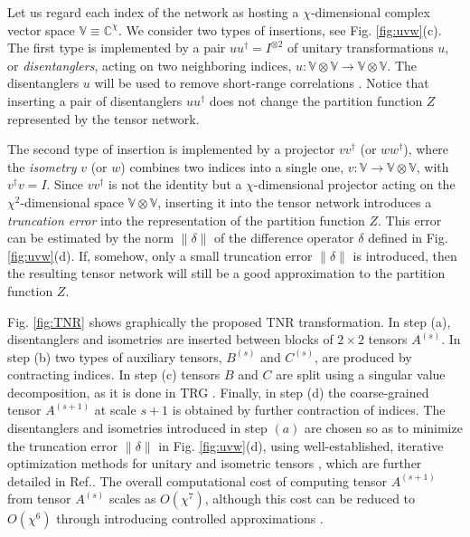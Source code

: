 \documentclass[aps,prl,twocolumn,showpacs,superscriptaddress,floatfix,10pt]{revtex4-1}
\begin{document}
Let us regard each index of the network as hosting a $\chi$-dimensional complex vector space $\mathbb{V} \equiv \mathbb{C}^{\chi}$. We consider two types of insertions, see Fig. \ref{fig:uvw}(c). The first type is implemented by a pair $uu^{\dagger}=I^{\otimes 2}$ of unitary transformations $u$, or \textit{disentanglers}, acting on two neighboring indices,  $u: \mathbb{V}\otimes \mathbb{V} \rightarrow \mathbb{V} \otimes \mathbb{V}$. The disentanglers $u$ will be used to remove short-range correlations \cite{disentanglers}.  
Notice that inserting a pair of disentanglers $uu^{\dagger}$ does not change the partition function $Z$ represented by the tensor network. 

The second type of insertion is implemented by a projector $vv^{\dagger}$ (or $ww^{\dagger}$), where the \textit{isometry} $v$ (or $w$) combines two indices into a single one, $v: \mathbb{V} \rightarrow \mathbb{V} \otimes \mathbb{V}$, with $v^{\dagger}v = I$. Since $vv^{\dagger}$ is not the identity but a $\chi$-dimensional projector acting on the $\chi^2$-dimensional space $\mathbb{V}\otimes \mathbb{V}$, inserting it into the tensor network introduces a \textit{truncation error} into the representation of the partition function $Z$. This error can be estimated by the norm $\| \delta \|$ of the difference operator $\delta$ defined in Fig. \ref{fig:uvw}(d). If, somehow, only a small truncation error $\| \delta \|$ is introduced, then the resulting tensor network will still be a good approximation to the partition function $Z$. 

Fig. \ref{fig:TNR} shows graphically the proposed TNR transformation. 
In step (a), disentanglers and isometries are inserted between blocks of $2\times 2$ tensors $A^{(s)}$. 
In step (b) two types of auxiliary tensors, $B^{(s)}$ and $C^{(s)}$, are produced by contracting indices. 
In step (c) tensors $B$ and $C$ are split using a singular value decomposition, as it is done in TRG \cite{WeightC}. 
Finally, in step (d) the coarse-grained tensor $A^{(s+1)}$ at scale $s+1$ is obtained by further contraction of indices. 
The disentanglers and isometries introduced in step $(a)$ are chosen so as to minimize the truncation error $\| \delta \|$ in Fig. \ref{fig:uvw}(d), using well-established, iterative optimization methods for unitary and isometric tensors \cite{Algorithms}, which are further detailed in Ref.\cite{TNRalgorithms}. The overall computational cost of computing tensor $A^{(s+1)}$ from tensor $A^{(s)}$ scales as $O(\chi^{7})$, although this cost can be reduced to $O(\chi^6)$ through introducing controlled approximations \cite{TNRalgorithms}.
 
\end{document}
